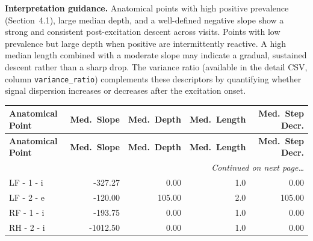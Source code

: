 \documentclass[a4paper,11pt]{article}
\begin{document}
\medskip
\noindent\textbf{Interpretation guidance.}
Anatomical points with high positive prevalence (Section~4.1), large median depth, and a
well-defined negative slope show a strong and consistent post-excitation descent across
visits.
Points with low prevalence but large depth when positive are intermittently reactive.
A high median length combined with a moderate slope may indicate a gradual, sustained
descent rather than a sharp drop.
The variance ratio (available in the detail CSV, column \texttt{variance\_ratio}) complements
these descriptors by quantifying whether signal dispersion increases or decreases after the
excitation onset.

\begin{small}
\begin{longtable}{p{4.5cm}rrrr}
\toprule
\textbf{Anatomical Point} &
\textbf{Med.\ Slope} &
\textbf{Med.\ Depth} &
\textbf{Med.\ Length} &
\textbf{Med.\ Step Decr.} \\
\midrule
\endfirsthead
\toprule
\textbf{Anatomical Point} &
\textbf{Med.\ Slope} &
\textbf{Med.\ Depth} &
\textbf{Med.\ Length} &
\textbf{Med.\ Step Decr.} \\
\midrule
\endhead
\midrule
\multicolumn{5}{r}{\small\emph{Continued on next page\ldots}} \\
\endfoot
\bottomrule
\endlastfoot
LF - 1 - i & -327.27 & 0.00 & 1.0 & 0.00 \\
LF - 2 - e & -120.00 & 105.00 & 2.0 & 105.00 \\
RF - 1 - i & -193.75 & 0.00 & 1.0 & 0.00 \\
RH - 2 - i & -1012.50 & 0.00 & 1.0 & 0.00 \\
\end{longtable}
\end{small}
\end{document}
